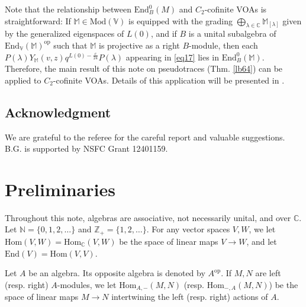 \documentclass[11pt,b5paper,notitlepage]{article}
\theoremstyle{definition}
\theoremstyle{plain}
\newcommand{\End}{\mathrm{End}} %
\newcommand{\Hom}{\mathrm{Hom}}
\newcommand{\opp}{\mathrm{op}}
\newcommand{\Vbb}{\mathbb V}
\newcommand{\Mbb}{\mathbb M}
\newcommand{\Cbb}{\mathbb C}
\newcommand{\Nbb}{\mathbb N}
\newcommand{\Zbb}{\mathbb Z}
\newcommand{\Mod}{\mathrm{Mod}}
\numberwithin{equation}{section}
\begin{document}
Note that the relationship between $\End^0_B(M)$ and $C_2$-cofinite VOAs is straightforward: If $\Mbb\in\Mod(\Vbb)$ is equipped with the grading $\bigoplus_{\lambda\in\Cbb}\Mbb_{[\lambda]}$ given by the generalized eigenspaces of $L(0)$, and if $B$ is a unital subalgebra of $\End_\Vbb(\Mbb)^\opp$ such that $\Mbb$ is projective as a right $B$-module, then each $P(\lambda)Y_\Mbb(v,z)q^{L(0)-\frac c{24}}P(\lambda)$ appearing in \eqref{eq17} lies in $\End^0_B(\Mbb)$. Therefore, the main result of this note on pseudotraces (Thm. \ref{lb64}) can be applied to $C_2$-cofinite VOAs. Details of this application will be presented in \cite{GZ5}.



\subsection*{Acknowledgment}

We are grateful to the referee for the careful report and valuable suggestions. B.G. is supported by NSFC Grant 12401159.



































\section{Preliminaries}

Throughout this note, algebras are associative, not necessarily unital, and over $\Cbb$. Let $\Nbb=\{0,1,2,\dots\}$ and $\Zbb_+=\{1,2,\dots\}$. For any vector spaces $V,W$, we let $\Hom(V,W)=\Hom_\Cbb(V,W)$ be the space of linear maps $V\rightarrow W$, and let $\End(V)=\Hom(V,V)$.

Let $A$ be an algebra. Its opposite algebra is denoted by $A^\opp$. If $M,N$ are left (resp. right) $A$-modules, we let $\Hom_{A,-}(M,N)$ (resp. $\Hom_{-,A}(M,N)$) be the space of linear maps $M\rightarrow N$ intertwining the left (resp. right) actions of $A$.
\end{document}
